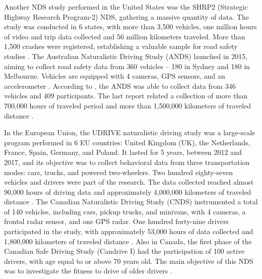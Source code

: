 Another NDS study performed in the United States was the SHRP2 (Strategic Highway Research Program-2) NDS, gathering a massive quantity of data. The study was conducted in 6 states, with more than 3,500 vehicles, one million hours of video and trip data collected and 56 million kilometers traveled. More than 1,500 crashes were registered, establishing a valuable sample for road safety studies \cite{Njord2015}. The Australian Naturalistic Driving Study (ANDS) launched in 2015, aiming to collect road safety data from 360 vehicles – 180 in Sydney and 180 in Melbourne. Vehicles are equipped with 4 cameras, GPS sensors, and an accelerometer \cite{ANDS2017a}. According to \textcite{Larue2019}, the ANDS was able to collect data from 346 vehicles and 409 participants. The last report related a collection of more than 700,000 hours of traveled period and more than 1,500,000 kilometers of traveled distance \cite{ANDS2017a}. 

In the European Union, the UDRIVE naturalistic driving study was a large-scale program performed in 6 EU countries: United Kingdom (UK), the Netherlands, France, Spain, Germany, and Poland. It lasted for 5 years, between 2012 and 2017, and its objective was to collect behavioral data from three transportation modes: cars, trucks, and powered two-wheelers. Two hundred eighty-seven vehicles and drivers were part of the research. The data collected reached almost 90,000 hours of driving data and approximately 4,000,000 kilometers of traveled distance \cite{VanNes2019}. The Canadian Naturalistic Driving Study (CNDS) instrumented a total of 140 vehicles, including cars, pickup trucks, and minivans, with 4 cameras, a frontal radar sensor, and one GPS radar. One hundred forty-nine drivers participated in the study, with approximately 53,000 hours of data collected and 1,800,000 kilometers of traveled distance \cite{CNDS2021}. Also in Canada, the first phase of the Canadian Safe Driving Study (Candrive I) had the participation of 100 active drivers, with age equal to or above 70 years old. The main objective of this NDS was to investigate the fitness to drive of older drivers \cite{Marshall2013}. 


